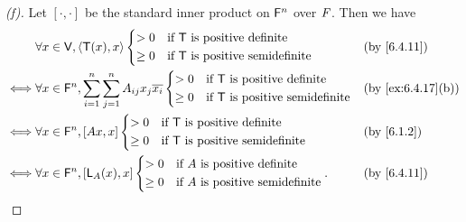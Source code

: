 \begin{proof}[(f)]
  Let \([\cdot, \cdot]\) be the standard inner product on \(\mathsf{F}^n\) over \(\mathit{F}\).
  Then we have
  \begin{align*}
         & \forall x \in \V, \inn{\T(x), x} \begin{dcases}
                                              > 0    & \text{if } \T \text{ is positive definite}     \\
                                              \geq 0 & \text{if } \T \text{ is positive semidefinite}
                                            \end{dcases}                                  &  & \by{6.4.11}                                      \\
    \iff & \forall x \in \vs{F}^n, \sum_{i = 1}^n \sum_{j = 1}^n A_{i j} x_j \conj{x_i} \begin{dcases}
                                                                                          > 0    & \text{if } \T \text{ is positive definite}     \\
                                                                                          \geq 0 & \text{if } \T \text{ is positive semidefinite}
                                                                                        \end{dcases} &  & \by{ex:6.4.17}[b] \\
    \iff & \forall x \in \vs{F}^n, [Ax, x] \begin{dcases}
                                             > 0    & \text{if } \T \text{ is positive definite}     \\
                                             \geq 0 & \text{if } \T \text{ is positive semidefinite}
                                           \end{dcases}                                  &  & \by{6.1.2}                                        \\
    \iff & \forall x \in \vs{F}^n, [\L_A(x), x] \begin{dcases}
                                                  > 0    & \text{if } A \text{ is positive definite}     \\
                                                  \geq 0 & \text{if } A \text{ is positive semidefinite}
                                                \end{dcases}.                                   &  & \by{6.4.11}
  \end{align*}
\end{proof}

